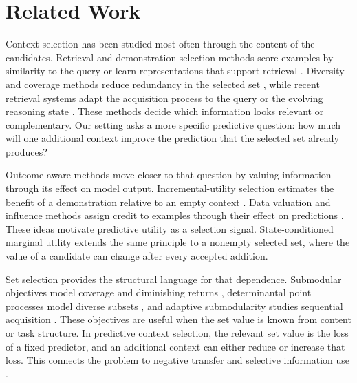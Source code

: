 \section{Related Work}

Context selection has been studied most often through the content of the
candidates. Retrieval and demonstration-selection methods score examples by
similarity to the query or learn representations that support retrieval
\citep{brown2020language,min2022rethinking,liu2022what,rubin2022learning,zhang2022active,su2023selective}.
Diversity and coverage methods reduce redundancy in the selected set
\citep{carbonell1998use,gupta-etal-2023-coverage,levy2023diverse}, while recent
retrieval systems adapt the acquisition process to the query or the evolving
reasoning state \citep{acra2025retrieval,crgs2026causal}. These methods decide
which information looks relevant or complementary. Our setting asks a more
specific predictive question: how much will one additional context improve the
prediction that the selected set already produces?

Outcome-aware methods move closer to that question by valuing information
through its effect on model output. Incremental-utility selection estimates the
benefit of a demonstration relative to an empty context
\citep{hashimoto-etal-2024-take}. Data valuation and influence methods assign
credit to examples through their effect on predictions
\citep{ghorbani2019data,koh2017understanding,pruthi2020estimating,ilyas2022datamodels}.
These ideas motivate predictive utility as a selection signal. State-conditioned
marginal utility extends the same principle to a nonempty selected set, where
the value of a candidate can change after every accepted addition.

Set selection provides the structural language for that dependence. Submodular
objectives model coverage and diminishing returns
\citep{lin2011class,nemhauser1978analysis,krause2014submodular}, determinantal
point processes model diverse subsets \citep{kulesza2012determinantal}, and
adaptive submodularity studies sequential acquisition
\citep{golovin2011adaptive,leskovec2007cost}. These objectives are useful when
the set value is known from content or task structure. In predictive context
selection, the relevant set value is the loss of a fixed predictor, and an
additional context can either reduce or increase that loss. This connects the
problem to negative transfer and selective information use
\citep{pan2010survey,wang2019characterizing}.

